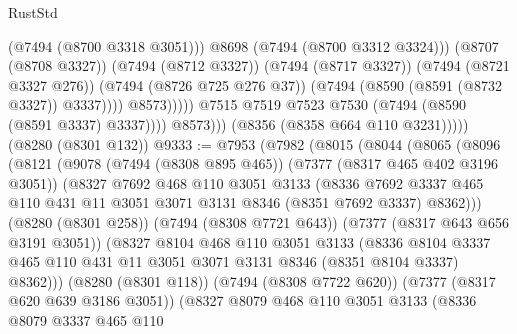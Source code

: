 \begin{lexlean}{RustStd}
\begin{coremodule}
{\begin{coremodule}
{{{{{{{{{{{{{{{{{{{{{{{{{{{{{{{{                                      (@7494 (@8700 @3318 @3051)))
                                    @8698
                                    (@7494 (@8700 @3312 @3324)))
                                  (@8707 (@8708 @3327))
                                  (@7494 (@8712 @3327))
                                  (@7494 (@8717 @3327))
                                  (@7494 (@8721 @3327 @276))
                                  (@7494 (@8726 @725 @276 @37))
                                  (@7494 (@8590 (@8591 (@8732 @3327)) @3337))))
                              @8573)))))
                    @7515
                    @7519
                    @7523
                    @7530
                    (@7494 (@8590 (@8591 @3337) @3337))))
                @8573)))
          (@8356 (@8358 @664 @110 @3231)))))
    (@8280 (@8301 @132))
@9333 := @7953
    (@7982
      (@8015
        (@8044
          (@8065
            (@8096
              (@8121
                (@9078
                  (@7494 (@8308 @895 @465))
                  (@7377 (@8317 @465 @402 @3196 @3051))
                  (@8327
                    @7692
                    @468
                    @110
                    @3051
                    @3133
                    (@8336
                      @7692
                      @3337
                      @465
                      @110
                      @431
                      @11
                      @3051
                      @3071
                      @3131
                      @8346
                      (@8351 @7692 @3337)
                      @8362)))
                (@8280 (@8301 @258))
                (@7494 (@8308 @7721 @643))
                (@7377 (@8317 @643 @656 @3191 @3051))
                (@8327
                  @8104
                  @468
                  @110
                  @3051
                  @3133
                  (@8336
                    @8104
                    @3337
                    @465
                    @110
                    @431
                    @11
                    @3051
                    @3071
                    @3131
                    @8346
                    (@8351 @8104 @3337)
                    @8362)))
              (@8280 (@8301 @118))
              (@7494 (@8308 @7722 @620))
              (@7377 (@8317 @620 @639 @3186 @3051))
              (@8327
                @8079
                @468
                @110
                @3051
                @3133
                (@8336
                  @8079
                  @3337
                  @465
                  @110
}}}}}}}}}}}}}}}}}}}}}}}}}}}}}}}}
\end{coremodule}}
\end{coremodule}
\end{lexlean}
